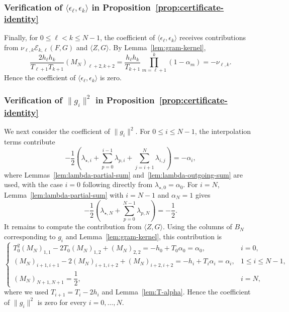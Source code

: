 \subsubsection{Verification of $\langle\epsilon_\ell,\epsilon_k\rangle$ in Proposition~\ref{prop:certificate-identity}}
Finally, for $0\le\ell<k\le N-1$, the coefficient of $\langle\epsilon_\ell,\epsilon_k\rangle$ receives contributions from $\nu_{\ell,k}\mathcal E_{k,\ell}(F,G)$ and $\langle Z,G\rangle$. By Lemma~\ref{lem:gram-kernel},
\[ \frac{2h_\ell h_k}{T_{\ell+1}T_{k+1}} (M_N)_{\ell+2,k+2}
= \frac{h_\ell h_k}{T_{k+1}} \prod_{m=\ell+1}^{k}(1-\alpha_m) =-\nu_{\ell,k}. \]
Hence the coefficient of $\langle\epsilon_\ell,\epsilon_k\rangle$ is zero.

\subsubsection{Verification of $\|g_i\|^2$ in Proposition~\ref{prop:certificate-identity}}
We next consider the coefficient of $\|g_i\|^2$. For $0\le i\le N-1$, the interpolation terms contribute
\[
-\frac12\left(\lambda_{\star,i}+\sum_{p=0}^{i-1}\lambda_{p,i}+\sum_{j=i+1}^{N}\lambda_{i,j}\right)=-\alpha_i,
\]
where Lemmas~\ref{lem:lambda-partial-sum} and~\ref{lem:lambda-outgoing-sum} are used, with the case $i=0$ following directly from $\lambda_{\star,0}=\alpha_0$. For $i=N$, Lemma~\ref{lem:lambda-partial-sum} with $i=N-1$ and $\alpha_N=1$ gives
\[
-\frac12\left(\lambda_{\star,N}+\sum_{p=0}^{N-1}\lambda_{p,N}\right)=-\frac12.
\]
It remains to compute the contribution from $\langle Z,G\rangle$. Using the columns of $B_N$ corresponding to $g_i$ and Lemma~\ref{lem:gram-kernel}, this contribution is
\[
\begin{cases}
T_0^2(M_N)_{1,1}-2T_0(M_N)_{1,2}+(M_N)_{2,2}
=-h_0+T_0\alpha_0=\alpha_0,&i=0,\\[0.4em]
(M_N)_{i+1,i+1}-2(M_N)_{i+1,i+2}+(M_N)_{i+2,i+2}
=-h_i+T_i\alpha_i=\alpha_i,&1\le i\le N-1,\\[0.4em]
(M_N)_{N+1,N+1}=\dfrac12,&i=N,
\end{cases}\]
where we used $T_{i+1}=T_i-2h_i$ and Lemma~\ref{lem:T-alpha}. Hence the coefficient of $\|g_i\|^2$ is zero for every $i=0,\ldots,N$.
